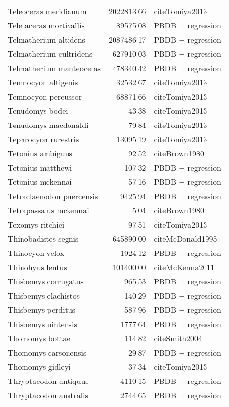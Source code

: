 \begin{table}[ht]
\begin{tabular}{lrl}
  Teleoceras meridianum & 2022813.66 & cite{Tomiya2013} \\ 
  Teletaceras mortivallis & 89575.08 & PBDB + regression \\ 
  Telmatherium altidens & 2087486.17 & PBDB + regression \\ 
  Telmatherium cultridens & 627910.03 & PBDB + regression \\ 
  Telmatherium manteoceras & 478340.42 & PBDB + regression \\ 
  Temnocyon altigenis & 32532.67 & cite{Tomiya2013} \\ 
  Temnocyon percussor & 68871.66 & cite{Tomiya2013} \\ 
  Tenudomys bodei & 43.38 & cite{Tomiya2013} \\ 
  Tenudomys macdonaldi & 79.84 & cite{Tomiya2013} \\ 
  Tephrocyon rurestris & 13095.19 & cite{Tomiya2013} \\ 
  Tetonius ambiguus & 92.52 & cite{Brown1980} \\ 
  Tetonius matthewi & 107.32 & PBDB + regression \\ 
  Tetonius mckennai & 57.16 & PBDB + regression \\ 
  Tetraclaenodon puercensis & 9425.94 & PBDB + regression \\ 
  Tetrapassalus mckennai & 5.04 & cite{Brown1980} \\ 
  Texomys ritchiei & 97.51 & cite{Tomiya2013} \\ 
  Thinobadistes segnis & 645890.00 & cite{McDonald1995} \\ 
  Thinocyon velox & 1924.12 & PBDB + regression \\ 
  Thinohyus lentus & 101400.00 & cite{McKenna2011} \\ 
  Thisbemys corrugatus & 965.53 & PBDB + regression \\ 
  Thisbemys elachistos & 140.29 & PBDB + regression \\ 
  Thisbemys perditus & 587.96 & PBDB + regression \\ 
  Thisbemys uintensis & 1777.64 & PBDB + regression \\ 
  Thomomys bottae & 114.82 & cite{Smith2004} \\ 
  Thomomys carsonensis & 29.87 & PBDB + regression \\ 
  Thomomys gidleyi & 37.34 & cite{Tomiya2013} \\ 
  Thryptacodon antiquus & 4110.15 & PBDB + regression \\ 
  Thryptacodon australis & 2744.65 & PBDB + regression \\ 

\end{tabular}
\end{table}
